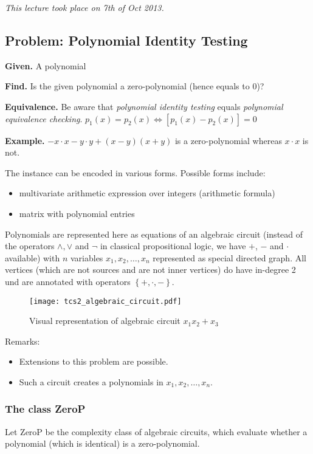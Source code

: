 \documentclass[a4paper]{article}
\newcommand{\given}[1]{\textbf{Given.} #1\par}
\newcommand{\find}[1]{\textbf{Find.} #1\par}
\newcommand{\cls}[1]{\rm{#1}}
\newcommand{\set}[1]{\left\{#1\right\}}
\newcommand{\dateref}[1]{\emph{This lecture took place on #1.}\par}
\newenvironment{spec}[0]{\begin{framed}}{\end{framed}}
\begin{document}
\dateref{7th of Oct 2013}

\subsection{Problem: Polynomial Identity Testing}
\label{sec:identity-test-polynomials-algorithm}
%
\begin{spec}
  \given{A polynomial}
  \find{Is the given polynomial a zero-polynomial (hence equals to $0$)?}
  \textbf{Equivalence.} Be aware that \emph{polynomial identity testing} equals \emph{polynomial equivalence checking}. $p_1(x) = p_2(x) \Leftrightarrow [p_1(x) - p_2(x)] = 0$ \par
  \textbf{Example.} $- x\cdot x - y\cdot y + (x - y)(x + y)$ is a zero-polynomial whereas $x\cdot x$ is not. \par

  The instance can be encoded in various forms. Possible forms include:
  \begin{itemize}
    \item multivariate arithmetic expression over integers (arithmetic formula)
    \item matrix with polynomial entries
  \end{itemize}
\end{spec}

Polynomials are represented here as equations of an algebraic circuit (instead of the operators $\land, \lor$ and $\neg$ in classical propositional logic, we have $+$, $-$ and $\cdot$ available) with $n$ variables $x_1, x_2, \ldots, x_n$
represented as special directed graph. All vertices (which are not sources and are not inner vertices) do have in-degree 2 und are annotated with operators $\set{+, \cdot, -}$.

\begin{figure}[ht]
  \begin{center}
    \texttt{[image: tcs2\_algebraic\_circuit.pdf]}
    \caption{Visual representation of algebraic circuit $x_1 x_2 + x_3$}
  \end{center}
\end{figure}

Remarks:
\begin{itemize}
  \item Extensions to this problem are possible.
  \item Such a circuit creates a polynomials in $x_1, x_2, \ldots, x_n$.
\end{itemize}

\subsubsection{The class \cls{ZeroP}}
%
Let \cls{ZeroP} be the complexity class of algebraic circuits,
which evaluate whether a polynomial (which is identical) is a zero-polynomial.
\end{document}
